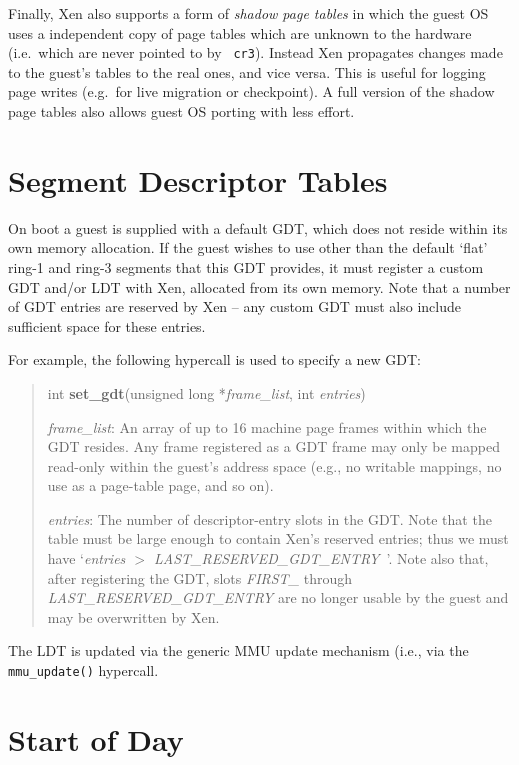 \documentclass[11pt,twoside,final,openright]{xenstyle}
\begin{document}
Finally, Xen also supports a form of \emph{shadow page tables} in
which the guest OS uses a independent copy of page tables which are
unknown to the hardware (i.e.\ which are never pointed to by {\tt
cr3}). Instead Xen propagates changes made to the guest's tables to the
real ones, and vice versa. This is useful for logging page writes
(e.g.\ for live migration or checkpoint). A full version of the shadow
page tables also allows guest OS porting with less effort.

\section{Segment Descriptor Tables}

On boot a guest is supplied with a default GDT, which does not reside
within its own memory allocation.  If the guest wishes to use other
than the default `flat' ring-1 and ring-3 segments that this GDT
provides, it must register a custom GDT and/or LDT with Xen,
allocated from its own memory. Note that a number of GDT 
entries are reserved by Xen -- any custom GDT must also include
sufficient space for these entries. 

For example, the following hypercall is used to specify a new GDT: 

\begin{quote}
int {\bf set\_gdt}(unsigned long *{\em frame\_list}, int {\em entries})

{\em frame\_list}: An array of up to 16 machine page frames within
which the GDT resides.  Any frame registered as a GDT frame may only
be mapped read-only within the guest's address space (e.g., no
writable mappings, no use as a page-table page, and so on).

{\em entries}: The number of descriptor-entry slots in the GDT.  Note
that the table must be large enough to contain Xen's reserved entries;
thus we must have `{\em entries $>$ LAST\_RESERVED\_GDT\_ENTRY}\ '.
Note also that, after registering the GDT, slots {\em FIRST\_} through
{\em LAST\_RESERVED\_GDT\_ENTRY} are no longer usable by the guest and
may be overwritten by Xen.
\end{quote}

The LDT is updated via the generic MMU update mechanism (i.e., via 
the {\tt mmu\_update()} hypercall. 

\section{Start of Day} 
\end{document}
